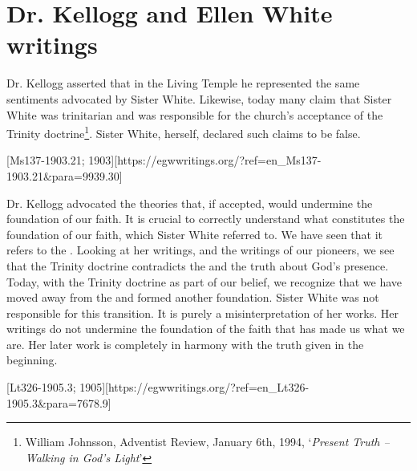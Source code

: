 \chapter{Dr. Kellogg and Ellen White writings}

Dr. Kellogg asserted that in the Living Temple he represented the same sentiments advocated by Sister White. Likewise, today many claim that Sister White was trinitarian and was responsible for the church's acceptance of the Trinity doctrine\footnote{William Johnsson, Adventist Review, January 6th, 1994, ‘\textit{Present Truth –Walking in God’s Light}’}. Sister White, herself, declared such claims to be false.

[Ms137-1903.21; 1903][https://egwwritings.org/?ref=en\_Ms137-1903.21&para=9939.30]

Dr. Kellogg advocated the theories that, if accepted, would undermine the foundation of our faith. It is crucial to correctly understand what constitutes the foundation of our faith, which Sister White referred to. We have seen that it refers to the . Looking at her writings, and the writings of our pioneers, we see that the Trinity doctrine contradicts the  and the truth about God’s presence. Today, with the Trinity doctrine as part of our belief, we recognize that we have moved away from the  and formed another foundation. Sister White was not responsible for this transition. It is purely a misinterpretation of her works. Her writings do not undermine the foundation of the faith that has made us what we are. Her later work is completely in harmony with the truth given in the beginning.

[Lt326-1905.3; 1905][https://egwwritings.org/?ref=en\_Lt326-1905.3&para=7678.9]

